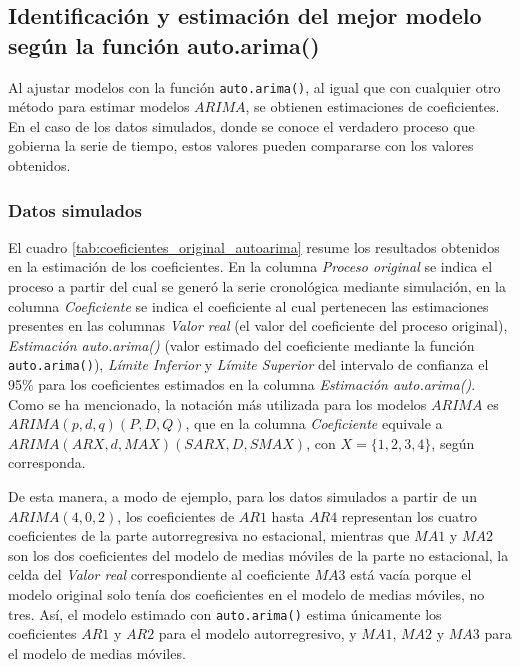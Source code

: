 \documentclass[
]{article}
\begin{document}
\subsection{Identificación y estimación del mejor modelo según la función auto.arima()}

Al ajustar modelos con la función \texttt{auto.arima()}, al igual que
con cualquier otro método para estimar modelos \(ARIMA\), se obtienen
estimaciones de coeficientes. En el caso de los datos simulados, donde
se conoce el verdadero proceso que gobierna la serie de tiempo, estos
valores pueden compararse con los valores obtenidos.

\subsubsection{Datos simulados}

El cuadro \ref{tab:coeficientes_original_autoarima} resume los
resultados obtenidos en la estimación de los coeficientes. En la columna
\emph{Proceso original} se indica el proceso a partir del cual se generó
la serie cronológica mediante simulación, en la columna
\emph{Coeficiente} se indica el coeficiente al cual pertenecen las
estimaciones presentes en las columnas \emph{Valor real} (el valor del
coeficiente del proceso original), \emph{Estimación auto.arima()} (valor
estimado del coeficiente mediante la función \texttt{auto.arima()}),
\emph{Límite Inferior} y \emph{Límite Superior} del intervalo de
confianza el 95\% para los coeficientes estimados en la columna
\emph{Estimación auto.arima()}. Como se ha mencionado, la notación más
utilizada para los modelos \(ARIMA\) es \(ARIMA(p,d,q)(P,D,Q)\), que en
la columna \emph{Coeficiente} equivale a
\(ARIMA(ARX, d, MAX)(SARX, D, SMAX)\), con \(X=\{1,2,3,4\}\), según
corresponda.

De esta manera, a modo de ejemplo, para los datos simulados a partir de
un \(ARIMA(4,0,2)\), los coeficientes de \(AR1\) hasta \(AR4\)
representan los cuatro coeficientes de la parte autorregresiva no
estacional, mientras que \(MA1\) y \(MA2\) son los dos coeficientes del
modelo de medias móviles de la parte no estacional, la celda del
\emph{Valor real} correspondiente al coeficiente \(MA3\) está vacía
porque el modelo original solo tenía dos coeficientes en el modelo de
medias móviles, no tres. Así, el modelo estimado con
\texttt{auto.arima()} estima únicamente los coeficientes \(AR1\) y
\(AR2\) para el modelo autorregresivo, y \(MA1\), \(MA2\) y \(MA3\) para
el modelo de medias móviles.
\end{document}
